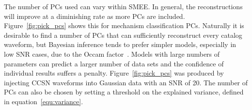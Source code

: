 The number of PCs used can vary within SMEE. In general, the reconstructions will improve at a diminishing rate as more PCs are included. Figure~\ref{fig:pick_pcs} shows this for mechanism classification PCs. Naturally it is desirable to find a number of PCs that can sufficiently reconstruct every catalog waveform, but Bayesian inference tends to prefer simpler models, especially in low SNR cases, due to the Occam factor~\cite{mackay2003information, thesis_jade}. Models with large numbers of parameters can predict a larger number of data sets and the confidence of individual results suffers a penalty. Figure~\ref{fig:pick_pcs} was produced by injecting CCSN waveforms into Gaussian data with an SNR of 20. The number of PCs can also be chosen by setting a threshold on the explained variance, defined in equation~\ref{equ:variance}.